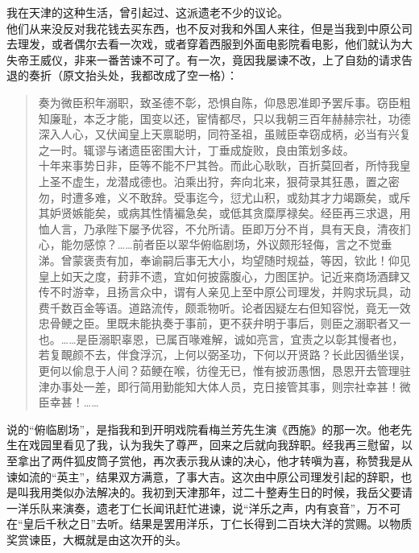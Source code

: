 我在天津的这种生活，曾引起过、这派遗老不少的议论。\\

他们从来没反对我花钱去买东西，也不反对我和外国人来往，但是当我到中原公司去理发，或者偶尔去看一次戏，或者穿着西服到外面电影院看电影，他们就认为大失帝王威仪，非来一番苦谏不可了。有一次，竟因我屡谏不改，上了自劾的请求告退的奏折（原文抬头处，我都改成了空一格）：\\

\begin{quote}
	奏为微臣积年溺职，致圣德不彰，恐惧自陈，仰恳恩准即予罢斥事。窃臣粗知廉耻，本乏才能，国变以还，宦情都尽，只以我朝三百年赫赫宗社，功德深入人心，又伏闻皇上天禀聪明，同符圣祖，虽贼臣幸窃成柄，必当有兴复之一时。辄谬与诸遗臣密围大计，丁垂成旋败，良由策划多歧。\\

十年来事势日非，臣等不能不尸其咎。而此心耿耿，百折莫回者，所恃我皇上圣不虚生，龙潜成德也。泊乘出狩，奔向北来，狠荷录其狂愚，置之密勿，时遭多难，义不敢辞。受事迄今，愆尤山积，或劾其才力竭蹶矣，或斥其妒贤嫉能矣，或病其性情褊急矣，或低其贪糜厚禄矣。经臣再三求退，用恤人言，乃承陛下屡予优容，不允所请。臣即万分不肖，具有天良，清夜扪心，能勿感惊？……前者臣以翠华俯临剧场，外议颇形轻侮，言之不觉垂涕。曾蒙褒责有加，奉谕嗣后事无大小，均望随时规益，等因，钦此！仰见皇上如天之度，葑菲不遗，宜如何披露腹心，力图匡护。记近来商场酒肆又传不时游幸，且扬言众中，谓有人亲见上至中原公司理发，并购求玩具，动费千数百金等语。道路流传，颇乖物听。论者因疑左右但知容悦，竟无一效忠骨鲠之臣。里既未能执奏于事前，更不获弁明于事后，则臣之溺职者又一也。……是臣溺职辜恩，已属百喙难解，诚如亮言，宜责之以彰其慢者也，若复靦颜不去，伴食浮沉，上何以弼圣功，下何以开贤路？长此因循坐误，更何以偷息于人间？茹鲠在喉，彷徨无已，惟有披沥愚悃，恳恩开去管理驻津办事处一差，即行简用勤能知大体人员，克日接管其事，则宗社幸甚！微臣幸甚！……\\
\end{quote}

说的“俯临剧场”，是指我和到开明戏院看梅兰芳先生演《西施》的那一次。他老先生在戏园里看见了我，认为我失了尊严，回来之后就向我辞职。经我再三慰留，以至拿出了两件狐皮筒子赏他，再次表示我从谏的决心，他才转嗔为喜，称赞我是从谏如流的“英主”，结果双方满意，了事大吉。这次由中原公司理发引起的辞职，也是叫我用类似办法解决的。我初到天津那年，过二十整寿生日的时候，我岳父要请一洋乐队来演奏，遗老丁仁长闻讯赶忙进谏，说“洋乐之声，内有哀音”，万不可在“皇后千秋之日”去听。结果是罢用洋乐，丁仁长得到二百块大洋的赏赐。以物质奖赏谏臣，大概就是由这次开的头。\\

